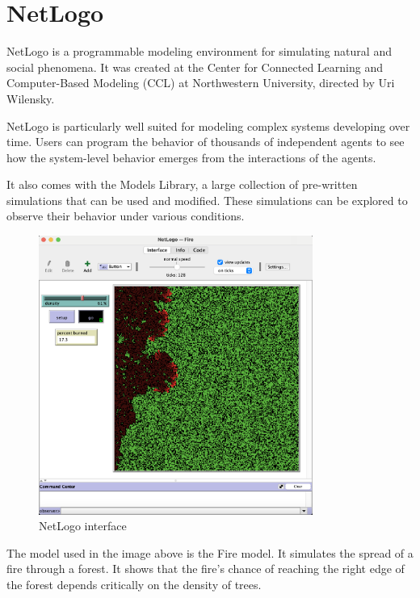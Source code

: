 \documentclass[12pt,a4paper,openright,twoside]{book}
\begin{document}
\section{NetLogo}

NetLogo is a programmable modeling environment for simulating natural and social phenomena. It was created at the Center
for Connected Learning and Computer-Based Modeling (CCL) at Northwestern University, directed by Uri Wilensky.

NetLogo is particularly well suited for modeling complex systems developing over time.
Users can program the behavior of thousands of independent agents to see how the system-level behavior emerges from the interactions of the agents.

It also comes with the Models Library, a large collection of pre-written simulations that can be used and modified.
These simulations can be explored to observe their behavior under various conditions.

\begin{figure}[h]
  \centering
  \includegraphics[width=0.8\textwidth]{figures/NetLogo-interface.png}
  \caption{NetLogo interface}
\end{figure}

The model used in the image above is the Fire model.
It simulates the spread of a fire through a forest. It shows that the fire's chance of reaching the right edge
of the forest depends critically on the density of trees.

\end{document}
